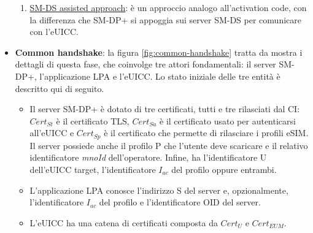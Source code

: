 \documentclass[10pt, twoside, openany]{book}
\begin{document}
\begin{itemize}
\begin{enumerate}
\item \underline{SM-DS assisted approach}: è un approccio analogo all'activation code, con la differenza che SM-DP+ si appoggia sui server SM-DS per comunicare con l'eUICC.
\end{enumerate}
\item \textbf{Common handshake}: la figura \ref{fig:common-handshake} tratta da \cite{Sec-analysis} mostra i dettagli di questa fase, che coinvolge tre attori fondamentali: il server SM-DP+, l'applicazione LPA e l'eUICC. Lo stato iniziale delle tre entità è descritto qui di seguito.
\begin{itemize}
\item Il server SM-DP+ è dotato di tre certificati, tutti e tre rilasciati dal CI: $Cert_{St}$ è il certificato TLS, $Cert_{Sa}$ è il certificato usato per autenticarsi all'eUICC e $Cert_{Sp}$ è il certificato che permette di rilasciare i profili eSIM. Il server possiede anche il profilo P che l'utente deve scaricare e il relativo identificatore \textit{mnoId} dell'operatore. Infine, ha l'identificatore U dell'eUICC target, l'identificatore $I_{ac}$ del profilo oppure entrambi.
\item L'applicazione LPA conosce l'indirizzo S del server e, opzionalmente, l'identificatore $I_{ac}$ del profilo e l'identificatore OID del server.
\item L'eUICC ha una catena di certificati composta da $Cert_{U}$ e $Cert_{EUM}$.
\end{itemize}

\end{itemize}
\end{document}
